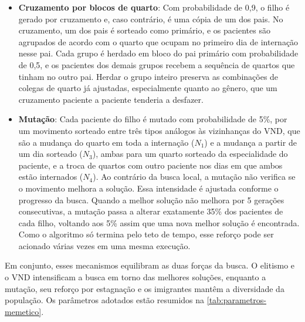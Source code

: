 \begin{itemize}
    \item \textbf{Cruzamento por blocos de quarto}: Com probabilidade de 0,9, o filho é gerado por cruzamento e, caso contrário, é uma cópia de um dos pais. No cruzamento, um dos pais é sorteado como primário, e os pacientes são agrupados de acordo com o quarto que ocupam no primeiro dia de internação nesse pai. Cada grupo é herdado em bloco do pai primário com probabilidade de 0,5, e os pacientes dos demais grupos recebem a sequência de quartos que tinham no outro pai. Herdar o grupo inteiro preserva as combinações de colegas de quarto já ajustadas, especialmente quanto ao gênero, que um cruzamento paciente a paciente tenderia a desfazer.
    
    \item \textbf{Mutação}: Cada paciente do filho é mutado com probabilidade de 5\%, por um movimento sorteado entre três tipos análogos às vizinhanças do VND, que são a mudança do quarto em toda a internação ($N_1$) e a mudança a partir de um dia sorteado ($N_3$), ambas para um quarto sorteado da especialidade do paciente, e a troca de quartos com outro paciente nos dias em que ambos estão internados ($N_4$). Ao contrário da busca local, a mutação não verifica se o movimento melhora a solução. Essa intensidade é ajustada conforme o progresso da busca. Quando a melhor solução não melhora por 5 gerações consecutivas, a mutação passa a alterar exatamente 35\% dos pacientes de cada filho, voltando aos 5\% assim que uma nova melhor solução é encontrada. Como o algoritmo só termina pelo teto de tempo, esse reforço pode ser acionado várias vezes em uma mesma execução.
\end{itemize}

Em conjunto, esses mecanismos equilibram as duas forças da busca. O elitismo e o VND intensificam a busca em torno das melhores soluções, enquanto a mutação, seu reforço por estagnação e os imigrantes mantêm a diversidade da população. Os parâmetros adotados estão resumidos na \autoref{tab:parametros-memetico}.


